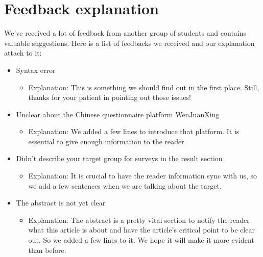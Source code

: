 \newpage
\section{Feedback explanation}
We've received a lot of feedback from another group of students and contains valuable suggestions. Here is a list of feedbacks we received and our explanation attach to it:
\begin{itemize}
    \item Syntax error
    \begin{itemize}
        \item Explanation: This is something we should find out in the first place. Still, thanks for your patient in pointing out those issues!
    \end{itemize}
    \item Unclear about the Chinese questionnaire platform WenJuanXing
    \begin{itemize}
        \item Explanation: We added a few lines to introduce that platform. It is essential to give enough information to the reader.
    \end{itemize}
    \item Didn’t describe your target group for surveys in the result section
    \begin{itemize}
        \item Explanation: It is crucial to have the reader information sync with us, so we add a few sentences when we are talking about the target.
    \end{itemize}
    \item The abstract is not yet clear
    \begin{itemize}
        \item Explanation: The abstract is a pretty vital section to notify the reader what this article is about and have the article's critical point to be clear out. So we added a few lines to it. We hope it will make it more evident than before.
    \end{itemize}

\end{itemize}
    
